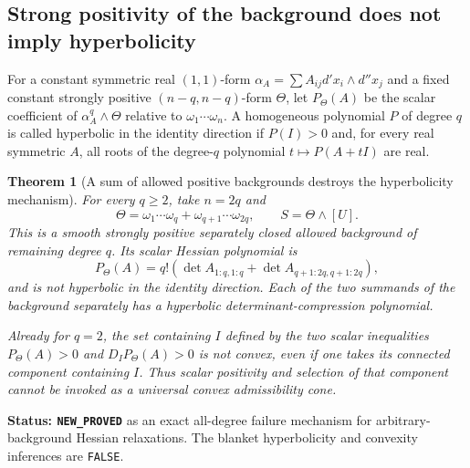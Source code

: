 \documentclass[11pt,a4paper]{article}
\numberwithin{equation}{section}
\newtheorem{theorem}{Theorem}[section]
\theoremstyle{definition}
\theoremstyle{remark}
\begin{document}
\subsection{Strong positivity of the background does not imply hyperbolicity}

For a constant symmetric real $(1,1)$-form
$\alpha_A=\sum A_{ij}d'x_i\wedge d''x_j$ and a fixed
constant strongly positive $(n-q,n-q)$-form $\Theta$,
let $P_\Theta(A)$ be the scalar coefficient of
$\alpha_A^q\wedge\Theta$ relative to
$\omega_1\cdots\omega_n$.
A homogeneous polynomial $P$ of degree $q$ is called
hyperbolic in the identity direction if $P(I)>0$ and,
for every real symmetric $A$, all roots of the degree-$q$
polynomial $t\mapsto P(A+tI)$ are real.

\begin{theorem}[A sum of allowed positive backgrounds destroys the hyperbolicity mechanism]
\label{thm:r12-positive-background-nonhyperbolicity}
For every $q\ge2$, take $n=2q$ and
\[
 \Theta=\omega_1\cdots\omega_q
                  +\omega_{q+1}\cdots\omega_{2q},
 \qquad S=\Theta\wedge[U].
 \tag{RH6}
\]
This is a smooth strongly positive separately closed allowed
background of remaining degree $q$.  Its scalar Hessian
polynomial is
\[
 P_\Theta(A)=q!\left(\det A_{1:q,1:q}
                          +\det A_{q+1:2q,q+1:2q}\right),
 \tag{RH7}
\]
and is not hyperbolic in the identity direction.  Each of
the two summands of the background separately has a
hyperbolic determinant-compression polynomial.

Already for $q=2$, the set containing $I$ defined by the
two scalar inequalities
$P_\Theta(A)>0$ and $D_I P_\Theta(A)>0$ is not convex,
even if one takes its connected component containing $I$.
Thus scalar positivity and selection of that component
cannot be invoked as a universal convex admissibility cone.
\end{theorem}

\noindent\textbf{Status: \texttt{NEW\_PROVED}} as an
exact all-degree failure mechanism for arbitrary-background
Hessian relaxations.  The blanket hyperbolicity and convexity
inferences are \texttt{FALSE}.
\end{document}
